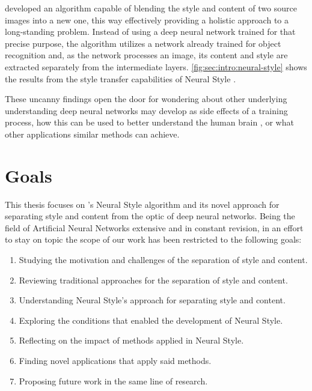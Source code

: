 \citeauthor{Gatys2015B} developed an algorithm capable of blending the style and content of two source images into a new one, this way effectively providing a holistic approach to a long-standing problem.
Instead of using a deep neural network trained for that precise purpose, the algorithm utilizes a network already trained for object recognition and, as the network processes an image, its content and style are extracted separately from the intermediate layers.
\autoref{fig:sec:intro:neural-style} shows the results from the style transfer capabilities of Neural Style \cite{Gatys2015B}.

These uncanny findings open the door for wondering about other underlying understanding deep neural networks may develop as side effects of a training process, how this can be used to better understand the human brain \cite{Yamins2016}, or what other applications similar methods can achieve.



\section{Goals}
\label{sec:intro:goals}

This thesis focuses on \citeauthor{Gatys2015B}'s Neural Style algorithm \cite{Gatys2015B} and its novel approach for separating style and content from the optic of deep neural networks.
Being the field of Artificial Neural Networks extensive and in constant revision, in an effort to stay on topic the scope of our work has been restricted to the following goals:

\begin{enumerate}
  \item Studying the motivation and challenges of the separation of style and content.
  \item Reviewing traditional approaches for the separation of style and content.
  \item Understanding Neural Style's approach for separating style and content.
  \item Exploring the conditions that enabled the development of Neural Style.
  \item Reflecting on the impact of methods applied in Neural Style.
  \item Finding novel applications that apply said methods.
  \item Proposing future work in the same line of research.
\end{enumerate}


